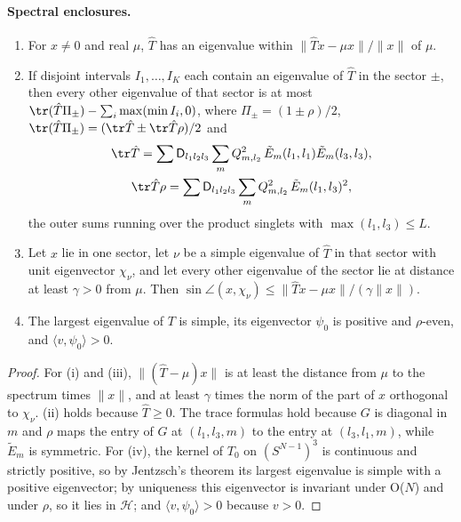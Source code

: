 \paragraph{Spectral enclosures.}
\begin{lemma}\label{lem:rhspec}
\begin{enumerate}
\item[(i)] For $x\ne0$ and real $\mu$, $\hat T$ has an eigenvalue within $\|\hat Tx-\mu x\|/\|x\|$ of $\mu$.
\item[(ii)] If disjoint intervals $I_1,\dots,I_K$ each contain an eigenvalue of $\hat T$ in the sector $\pm$, then every other eigenvalue of that sector is
at most $\tr(\hat T\Pi_\pm)-\sum_i\max(\min I_i,0)$, where $\Pi_\pm=(1\pm\rho)/2$, $\tr(\hat T\Pi_\pm)=(\tr\hat T\pm\tr\hat T\rho)/2$ and
\begin{gather*}
\tr\hat T=\sum\mathsf D_{l_1l_2l_3}\sum_mQ_{m,l_2}^2\,\tilde E_m(l_1,l_1)\tilde E_m(l_3,l_3),\\
\tr\hat T\rho=\sum\mathsf D_{l_1l_2l_3}\sum_mQ_{m,l_2}^2\,\tilde E_m(l_1,l_3)^2,
\end{gather*}
the outer sums running over the product singlets with $\max(l_1,l_3)\le L$.
\item[(iii)] Let $x$ lie in one sector, let $\nu$ be a simple eigenvalue of $\hat T$ in that sector with unit eigenvector $\chi_\nu$, and let every other
eigenvalue of the sector lie at distance at least $\gamma>0$ from $\mu$. Then $\sin\angle(x,\chi_\nu)\le\|\hat Tx-\mu x\|/(\gamma\|x\|)$.
\item[(iv)] The largest eigenvalue of $T$ is simple, its eigenvector $\psi_0$ is positive and $\rho$-even, and $\langle v,\psi_0\rangle>0$.
\end{enumerate}
\end{lemma}

\begin{proof}
For (i) and (iii), $\|(\hat T-\mu)x\|$ is at least the distance from $\mu$ to the spectrum times $\|x\|$, and at least $\gamma$ times the norm of the part of
$x$ orthogonal to $\chi_\nu$. (ii) holds because $\hat T\ge0$. The trace formulas hold because $G$ is diagonal in $m$ and $\rho$ maps the entry of $G$ at
$(l_1,l_3,m)$ to the entry at $(l_3,l_1,m)$, while $\tilde E_m$ is symmetric. For (iv), the kernel of $T_0$ on $(S^{N-1})^3$ is continuous and strictly
positive, so by Jentzsch's theorem its largest eigenvalue is simple with a positive eigenvector; by uniqueness this eigenvector is invariant under
O($N$) and under $\rho$, so it lies in $\mathcal H$; and $\langle v,\psi_0\rangle>0$ because $v>0$.
\end{proof}

